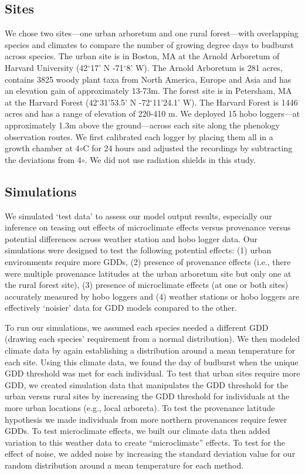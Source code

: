 \documentclass{article}\usepackage[]{graphicx}\usepackage[]{color}
\begin{document}
\subsection*{Sites}
We chose two sites---one urban arboretum and one rural forest---with overlapping species and climates to compare the number of growing degree days to budburst across species. The urban site is in Boston, MA at the Arnold Arboretum of Harvard University (42$^{\circ}$17' N -71$^{\circ}$8' W). The Arnold Arboretum is 281 acres, contains 3825 woody plant taxa from North America, Europe and Asia and has an elevation gain of approximately 13-73m. The forest site is in Petersham, MA at the Harvard Forest (42$^{\circ}$31'53.5' N -72$^{\circ}$11'24.1' W). The Harvard Forest is 1446 acres and has a range of elevation of 220-410 m. We deployed 15 hobo loggers---at approximately 1.3m above the ground---across each site along the phenology observation routes. We first calibrated each logger by placing them all in a growth chamber at 4${\circ}$C for 24 hours and adjusted the recordings by subtracting the deviations from 4${\circ}$. We did not use radiation shields in this study.

\subsection*{Simulations}
We simulated `test data' to assess our model output results, especially our inference on teasing out effects of microclimate effects versus provenance versus potential differences across weather station and hobo logger data. Our simulations were designed to test the following potential effects: (1) urban environments require more GDDs, (2) presence of provenance effects (i.e., there were multiple provenance latitudes at the urban arboretum site but only one at the rural forest site), (3) presence of microclimate effects (at one or both sites) accurately measured by hobo loggers and (4) weather stations or hobo loggers are effectively `noisier' data for GDD models compared to the other. 

To run our simulations, we assumed each species needed a different GDD (drawing each species' requirement from a normal distribution). We then modeled climate data by again establishing a distribution around a mean temperature for each site. Using this climate data, we found the day of budburst when the unique GDD threshold was met for each individual. To test that urban sites require more GDD, we created simulation data that manipulates the GDD threshold for the urban versus rural sites by increasing the GDD threshold for individuals at the more urban locations (e.g., local arboreta). To test the provenance latitude hypothesis we made individuals from more northern provenances require fewer GDDs. To test microclimate effects, we built our climate data then added variation to this weather data to create ``microclimate'' effects.  To test for the effect of noise, we added noise by increasing the standard deviation value for our random distribution around a mean temperature for each method.
\end{document}
